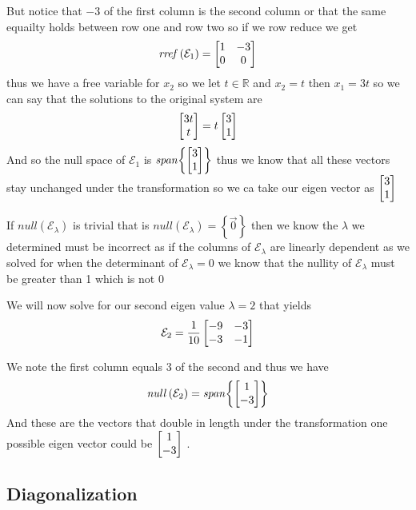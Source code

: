 \documentclass[11pt]{book}
\begin{document}
\begin{eg}
\[    \]
    But notice that $-3$ of the first column is the second column or that the same equailty holds between row one and row two so if we row reduce we get
    \[
    \mathit{rref} \left(\mathcal{E} _{1} \right) = \mat[b]{ 1 & -3 \\ 0 & 0 }
    \]
    thus we have a free variable for $x_2$ so we let $t \in \mathbb{R} $ and $x_2 = t$ then $x_1 = 3t $ so we can say that the solutions to the original system are
    \[
    \mat{ 3t \\ t } = t\mat{ 3 \\ 1 } 
    \]
    And so the null space of $\mathcal{E} _{1} $ is $\mathit{span} {\left\{ \mat{ 3 \\ 1 }  \right\} } $ thus we know that all these vectors stay unchanged under the transformation so we ca take our eigen vector as $\mat{ 3 \\ 1 } $  
\end{eg}

\begin{remark}
    If $\mathit{null} \left(\mathcal{E} _{\lambda } \right) $ is trivial that is $\mathit{null} \left(\mathcal{E} _{\lambda } \right) = \left\{ \vec{0}  \right\} $ then we know the $\lambda $ we determined must be incorrect as if the columns of $\mathcal{E} _{\lambda } $ are linearly dependent as we solved for when the determinant of $\mathcal{E} _{\lambda } = 0$ we know that the nullity of $\mathcal{E} _{\lambda } $ must be greater than 1 which is not 0
\end{remark}

We will now solve for our second eigen value $\lambda = 2$ that yields 
\[
\mathcal{E} _{2} = \frac{1}{10}\mat[b]{ -9 & -3 \\ -3 & -1 }
\]

We note the first column equals 3 of the second and thus we have 
\[
\mathit{null} \left(\mathcal{E} _{2} \right) = \mathit{span} {\left\{ \mat{ 1 \\ -3 }  \right\} } 
\]
And these are the vectors that double in length under the transformation one possible eigen vector could be $\mat{ 1 \\ -3 } $    .




\subsection{Diagonalization}%
\label{sub:diagonalization}
\end{document}
